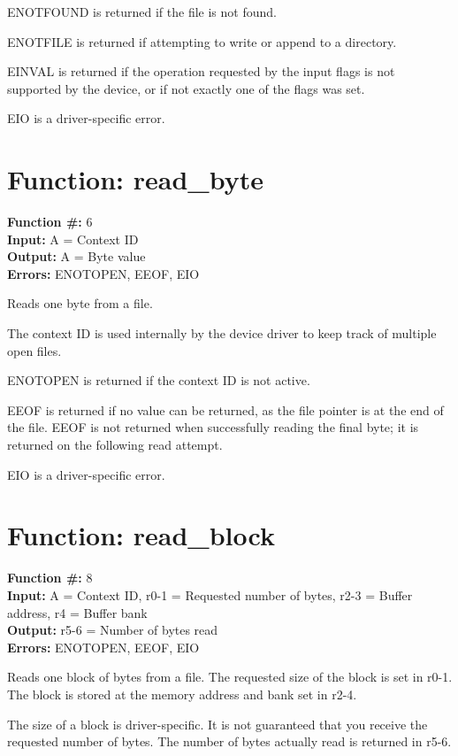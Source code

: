 ENOTFOUND is returned if the file is not found.

ENOTFILE is returned if attempting to write or append
to a directory.

EINVAL is returned if the operation requested by the input flags is 
not supported by the device, or if not exactly one of the flags was set.

EIO is a driver-specific error.


\section{Function: read\_byte}

\textbf{Function \#:} 6 \\
\textbf{Input:} A = Context ID \\
\textbf{Output:} A = Byte value \\
\textbf{Errors:} ENOTOPEN, EEOF, EIO

Reads one byte from a file.

The context ID is used internally by the device driver to keep
track of multiple open files.

ENOTOPEN is returned if the context ID is not active.

EEOF is returned if no value can be returned, as the file
pointer is at the end of the file. EEOF is not returned when
successfully reading the final byte; it is returned on
the following read attempt.

EIO is a driver-specific error.


\section{Function: read\_block}

\textbf{Function \#:} 8 \\
\textbf{Input:} A = Context ID, r0-1 = Requested number of bytes, r2-3 = Buffer address, r4 = Buffer bank \\
\textbf{Output:} r5-6 = Number of bytes read \\
\textbf{Errors:} ENOTOPEN, EEOF, EIO

Reads one block of bytes from a file. The requested size of the block is set in r0-1.
The block is stored at the memory address and bank set in r2-4.

The size of a block is driver-specific. It is not guaranteed that you receive the requested 
number of bytes. The number of bytes actually read is returned in r5-6.

